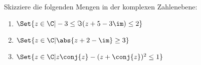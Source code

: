 \begin{exercise}
  Skizziere die folgenden Mengen in der komplexen Zahlenebene:
  \begin{enumerate}[label=(\alph*)]
  \item $\Set{ z \in \C | -3 \leq \Im(z+5-3\im) \leq 2 }$
  \item $\Set{ z \in \C | \abs{z + 2 - \im} \geq 3 }$
  \item $\Set{ z \in \C | z \conj{z} - (z + \conj{z} )^2 \leq 1 }$
  \end{enumerate}
\end{exercise}
